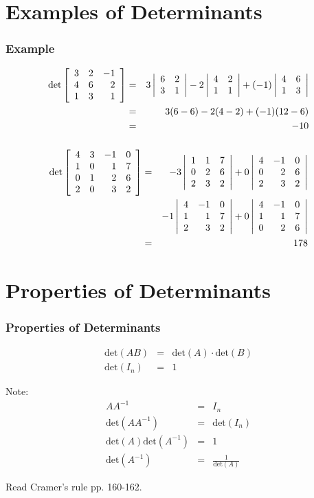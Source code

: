 \section{Examples of Determinants}

\begin{frame}
  \frametitle{Example}

  \begin{eqnarray*}
    \mathrm{det}
    \left[ \begin{array}{rrr} 3 & 2 & -1 \\ 4 & 6 & 2 \\ 1 & 3 & 1 \end{array} \right]
    & = & 
    3\left| \begin{array}{rr} 6 & 2 \\ 3 & 1 \end{array} \right| - 2 \left| \begin{array}{rr} 4 & 2 \\ 1 & 1 \end{array} \right| 
    + (-1) \left| \begin{array}{rr} 4 & 6 \\ 1 & 3 \end{array} \right| \\
    & = & 3 (6-6) - 2(4-2) + (-1) (12-6) \\
    & = & -10
  \end{eqnarray*}

\end{frame}


\begin{frame}
  \frametitle{}

  \begin{eqnarray*}
    \mathrm{det}
    \left[ \begin{array}{rrrr}
    4 & 3 & -1 & 0 \\ 
    1 & 0 & 1 & 7 \\ 
    0 & 1 & 2 & 6 \\ 
    2 & 0 & 3 & 2 \\ 
    \end{array} \right]
    & = & 
    -3 \left| \begin{array}{rrr} 1 & 1 & 7 \\ 0 & 2 & 6 \\ 2 & 3 & 2 \end{array} \right|
    + 0 \left| \begin{array}{rrr} 4 & -1 & 0 \\ 0 & 2 & 6 \\ 2 & 3 & 2 \end{array} \right| \\
    & & 
    - 1 \left| \begin{array}{rrr} 4 & -1 & 0 \\ 1 & 1 & 7 \\ 2 & 3 & 2 \end{array} \right|
    + 0 \left| \begin{array}{rrr} 4 & -1 & 0 \\ 1 & 1 & 7 \\ 0 & 2 & 6 \end{array} \right| \\
    & = & 178
  \end{eqnarray*}


\end{frame}


\section{Properties of Determinants}

\begin{frame}
  \frametitle{Properties of Determinants}

  \begin{eqnarray*}
    \mathrm{det}(AB) & = & \mathrm{det}(A) \cdot \mathrm{det}(B) \\
    \mathrm{det}(I_n) & = & 1
  \end{eqnarray*}

  Note:
  \begin{eqnarray*}
    A A^{-1} & = & I_n \\
    \mathrm{det}(A A^{-1}) & = & \mathrm{det}(I_n) \\
    \mathrm{det}(A) \mathrm{det}(A^{-1}) & = & 1 \\
    \mathrm{det}(A^{-1}) & = & \frac{1}{\mathrm{det}(A)}
  \end{eqnarray*}

  Read Cramer's rule pp. 160-162.

\end{frame}


